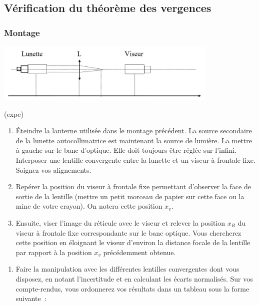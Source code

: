 \documentclass[../main/main.tex]{subfiles}
\begin{document}
\subsection{Vérification du théorème des vergences}

\subsubsection{Montage}

\begin{center}
	\includegraphics[width=0.8\textwidth]{montage_verg_lunette}
\end{center}

\begin{tcb}(expe){}
	\begin{enumerate}
		\item Éteindre la lanterne utilisée dans le montage précédent. La source
		      secondaire de la lunette autocollimatrice est maintenant la source de
		      lumière. La mettre à gauche sur le banc d'optique. Elle doit toujours
		      être réglée sur l'infini. Interposer une lentille convergente entre la
		      lunette et un viseur à frontale fixe. Soignez vos alignements.

		\item Repérer la position du viseur à frontale fixe permettant d'observer
		      la face de sortie de la lentille (mettre un petit morceau de papier sur
		      cette face ou la mine de votre crayon). On notera cette position $x_v$.

		\item Ensuite, viser l'image du réticule avec le viseur et relever la
		      position $x_{R}$ du viseur à frontale fixe correspondante sur le banc
		      optique. Vous chercherez cette position en éloignant le viseur d'environ
		      la distance focale de la lentille par rapport à la position $x_v$
		      précédemment obtenue.
	\end{enumerate}
\end{tcb}

\begin{enumerate}[label=\sqenumi, start=3]
	\item Faire la manipulation avec les différentes lentilles convergentes
	      dont vous disposez, en notant l'incertitude et en calculant les écarts
	      normalisés. Sur vos compte-rendus, vous ordonnerez vos résultats dans un
	      tableau sous la forme suivante~:
\end{enumerate}
\end{document}
